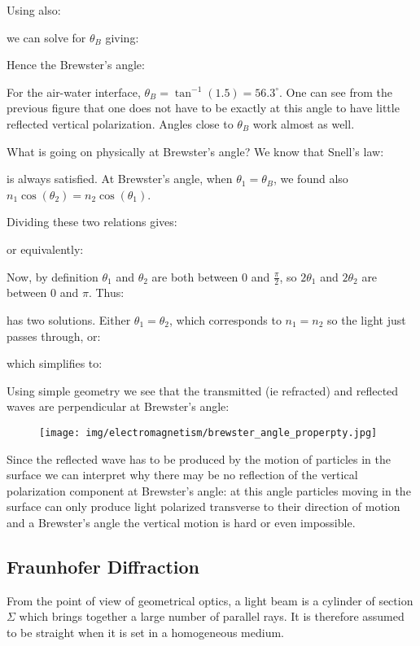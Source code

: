 	Using also:
	
	we can solve for $\theta_{B}$ giving:
	
	Hence the Brewster's angle:
	
	For the air-water interface, $\theta_{B}=\tan^{-1} (1.5)=56.3^{\circ}$. One can see from the previous figure that one does not have to be exactly at this angle to have little reflected vertical polarization. Angles close to $\theta_{B}$ work almost as well.

	What is going on physically at Brewster's angle? We know that Snell's law:
	
	is always satisfied. At Brewster's angle, when $\theta_{1}=\theta_{B}$, we found also $n_{1} \cos (\theta_{2})=n_{2} \cos(\theta_{1})$. 
	
	Dividing these two relations gives:
	
	or equivalently:
	
	Now, by definition $\theta_{1}$ and $\theta_{2}$ are both between $0$ and $\frac{\pi}{2}$, so $2 \theta_{1}$ and $2 \theta_{2}$ are between $0$ and $\pi$. Thus:
	
	has two solutions. Either $\theta_{1}=\theta_{2}$, which corresponds to $n_{1}=n_{2}$ so the light just passes through, or:
	
	which simplifies to:
	
	Using simple geometry we see that the transmitted (ie refracted) and reflected waves are perpendicular at Brewster's angle:
	\begin{figure}[H]
		\centering
		\texttt{[image: img/electromagnetism/brewster\_angle\_properpty.jpg]}
	\end{figure}
	Since the reflected wave has to be produced by the motion of particles in the surface we can interpret why there may be no reflection of the vertical polarization component at Brewster’s angle: at this angle particles moving in the surface can only produce light polarized transverse to their direction of motion and a Brewster's angle the vertical motion is hard or even impossible.
		
	\pagebreak
	\subsection{Fraunhofer Diffraction}\label{fraunhofer diffraction}
	From the point of view of geometrical optics, a light beam is a cylinder of section $\Sigma$ which brings together a large number of parallel rays. It is therefore assumed to be straight when it is set in a homogeneous medium.
	

